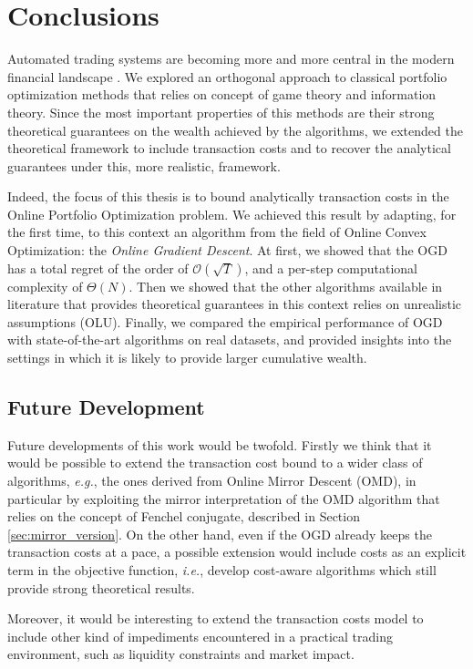 \chapter{Conclusions}\label{ch:conclusions}

Automated trading systems are becoming more and more central in the modern financial landscape \cite{treleaven2013algorithmic}. We explored an orthogonal approach to classical portfolio optimization methods that relies on concept of game theory and information theory. Since the most important properties of this methods are their strong theoretical guarantees on the wealth achieved by the algorithms, we extended the theoretical framework to include transaction costs and to recover the analytical guarantees under this, more realistic, framework.

Indeed, the focus of this thesis is to bound analytically transaction costs in the Online Portfolio Optimization problem.
We achieved this result by adapting, for the first time, to this context an algorithm from the field of Online Convex Optimization: the \emph{Online Gradient Descent}.
At first, we showed that the OGD has a total regret of the order of $\mathcal{O}(\sqrt{T})$, and a per-step computational complexity of $\Theta(N)$.
Then we showed that the other algorithms available in literature that provides theoretical guarantees in this context relies on unrealistic assumptions (OLU).
Finally, we compared the empirical performance of OGD with state-of-the-art algorithms on real datasets, and provided insights into the settings in which it is likely to provide larger cumulative wealth.

\section{Future Development}
Future developments of this work would be twofold.
Firstly we think that it would be possible to extend the transaction cost bound to a wider class of algorithms, \emph{e.g.}, the ones derived from Online Mirror Descent (OMD), in particular by exploiting the mirror interpretation of the OMD algorithm that relies on the concept of Fenchel conjugate, described in Section \ref{sec:mirror_version}.
On the other hand, even if the OGD already keeps the transaction costs at a pace, a possible extension would include costs as an explicit term in the objective function, \emph{i.e.}, develop cost-aware algorithms which still provide strong theoretical results.

Moreover, it would be interesting to extend the transaction costs model to include other kind of impediments encountered in a practical trading environment, such as liquidity constraints and market impact.
